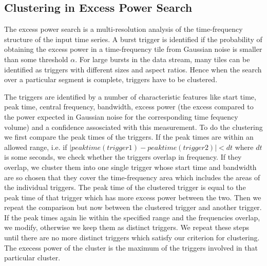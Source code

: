 \clearpage

\subsection{Clustering in Excess Power Search}
\label{section:clustering}

The excess power search is a multi-resolution analysis of the
time-frequency structure of the input time series.  A burst trigger is
identified if the probability of obtaining the excess power in a
time-frequency tile from Gaussian noise is smaller than some threshold
$\alpha$.   For large bursts in the data stream, many tiles can be
identified as triggers with different sizes and aspect ratios.   Hence when
the search over a particular segment is complete,   triggers have to be
clustered. 

The triggers are identified by a number of characteristic features like
start time,  peak time,  central frequency,  bandwidth,  excess power (the
excess compared to the power expected in Gaussian noise for the
corresponding time fequency volume)  and a confidence assosciated with this
measurement.  To do the clustering we first compare the peak times of the
triggers.  If the peak times are within an allowed range,  i.e. if
$|peaktime(trigger 1) - peaktime(trigger 2)| < dt$ where $dt$ is some
seconds,  we check whether the triggers  overlap in frequency.  If they
overlap,  we cluster them into one single trigger whose start time and
bandwidth are so chosen that they cover the time-frequency area which
includes the areas of the individual triggers.  The peak time of the
clustered trigger is equal to the peak time of that trigger which has more
excess power between the two.  Then we repeat the comparison but now
between the clustered trigger and another trigger.  If the peak times again
lie within the specified range and the frequencies overlap,  we modify,
otherwise we keep them as distinct triggers.  We repeat these steps until
there are no more distinct triggers which satisfy our criterion for
clustering.  The execess power of the cluster is the maximum of the
triggers involved in that particular cluster.

